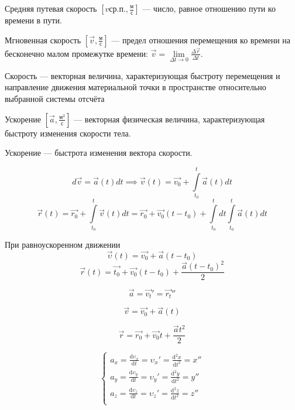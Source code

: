 \begin{definition}
    Средняя путевая скорость $[v{ср.п.}, \frac{м}{с}]$ — число, равное отношению пути ко времени в пути.
\end{definition}

\begin{definition}
    Мгновенная скорость  $[\vec v, \frac{м}{с}]$ — предел отношения перемещения ко времени на бесконечно малом промежутке времени: 
$\vec v = \lim\limits_{\Delta t\to0}\frac{\Delta\vec r}{\Delta t}$.
\end{definition}

\begin{definition}
    Скорость — векторная величина, характеризующая быстроту перемещения и направление движения материальной точки в пространстве относительно выбранной системы отсчёта
\end{definition}

\begin{definition}
    Ускорение $[\vec a, \frac{м^2}{с}]$ — векторная физическая величина, характеризующая быстроту изменения скорости тела.
\end{definition}

\begin{remark}
    Ускорение — быстрота изменения вектора скорости.
\end{remark}

$$d\vec v = \vec a(t) dt \implies \vec v(t) = \vec{v_0} + \int\limits_{t_0}^{t} \vec a(t) dt$$
$$\vec r(t) = \vec{r_0} + \int\limits_{t_0}^{t} \vec v(t)dt = \vec{r_0} + \vec{v_0}(t-t_0) + \int\limits_{t_0}^{t} dt \int\limits_{t_0}^{t} \vec a(t) dt$$

При равноускоренном движении
$$\vec\upsilon(t)=\vec{v_0}+\vec a(t-t_0)$$
$$\vec r(t)=\vec{t_0}+\vec{v_0}(t-t_0)+\frac{\vec a(t-t_0)^2}{2}$$


$$\vec{a} = \vec{v_t}' = \vec{r_t}''$$

$$\vec{v} = \vec{v_0} + \vec{a}(t)$$

$$\vec{r} = \vec{r_0} + \vec{v_0}t + \frac{\vec a t^2}{2}$$

$$\begin{cases}
a_x=\frac{\mathrm{d}\upsilon_x}{\mathrm{d}t}=\upsilon_x'=\frac{\mathrm{d}^2x}{\mathrm{d}t^2}=x''\\
a_y=\frac{\mathrm{d}\upsilon_y}{\mathrm{d}t}=\upsilon_y'=\frac{\mathrm{d}^2y}{\mathrm{d}t^2}=y''\\
a_z=\frac{\mathrm{d}\upsilon_z}{\mathrm{d}t}=\upsilon_z'=\frac{\mathrm{d}^2z}{\mathrm{d}t^2}=z''\\
\end{cases}$$

